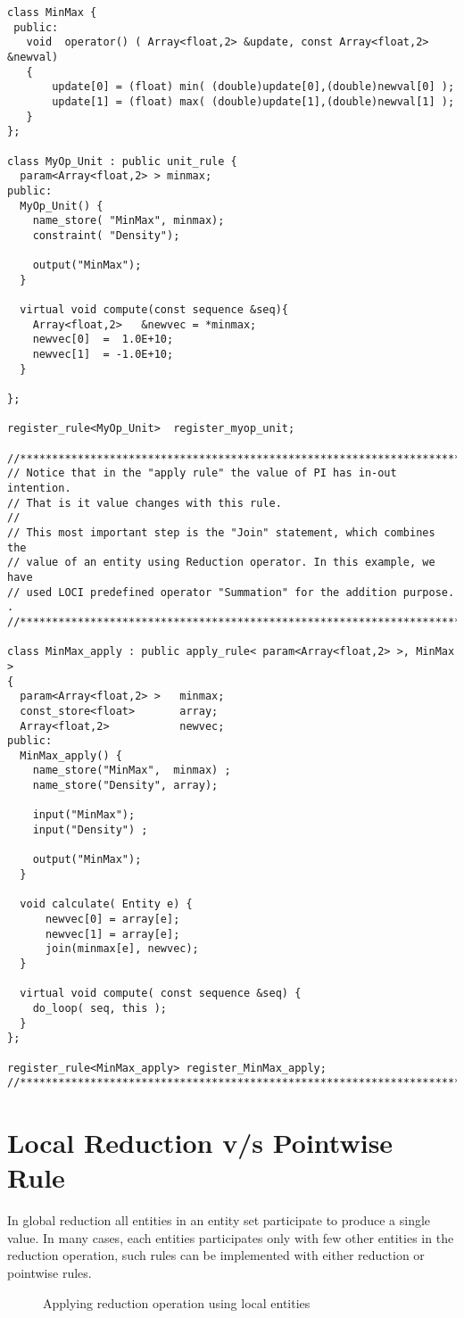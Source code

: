 \begin{verbatim}
class MinMax {
 public:
   void  operator() ( Array<float,2> &update, const Array<float,2> &newval)
   {
       update[0] = (float) min( (double)update[0],(double)newval[0] );
       update[1] = (float) max( (double)update[1],(double)newval[1] );
   }
};

class MyOp_Unit : public unit_rule {
  param<Array<float,2> > minmax;
public:
  MyOp_Unit() {
    name_store( "MinMax", minmax);
    constraint( "Density");
    
    output("MinMax");
  }

  virtual void compute(const sequence &seq){
    Array<float,2>   &newvec = *minmax;
    newvec[0]  =  1.0E+10;
    newvec[1]  = -1.0E+10;
  }

};

register_rule<MyOp_Unit>  register_myop_unit;

//*********************************************************************
// Notice that in the "apply rule" the value of PI has in-out intention.
// That is it value changes with this rule.
//
// This most important step is the "Join" statement, which combines the
// value of an entity using Reduction operator. In this example, we have
// used LOCI predefined operator "Summation" for the addition purpose. .
//*********************************************************************

class MinMax_apply : public apply_rule< param<Array<float,2> >, MinMax >
{
  param<Array<float,2> >   minmax;
  const_store<float>       array;
  Array<float,2>           newvec;
public:
  MinMax_apply() {
    name_store("MinMax",  minmax) ;
    name_store("Density", array);
    
    input("MinMax");
    input("Density") ;

    output("MinMax");
  }
  
  void calculate( Entity e) {
      newvec[0] = array[e];
      newvec[1] = array[e];
      join(minmax[e], newvec);
  }
  
  virtual void compute( const sequence &seq) {
    do_loop( seq, this );
  }
};

register_rule<MinMax_apply> register_MinMax_apply;
//*********************************************************************
\end{verbatim}
%
\section {Local Reduction v/s Pointwise Rule }
In global reduction all entities in an entity set participate to produce a single
value. In many cases, each entities participates only with few other entities in 
the reduction operation, such rules can be implemented with either reduction
or pointwise rules.
\begin{figure}[h]
\vspace{2.50in}\caption { Applying reduction operation using local entities}
\label {FigLocalReduction}
\end{figure}

